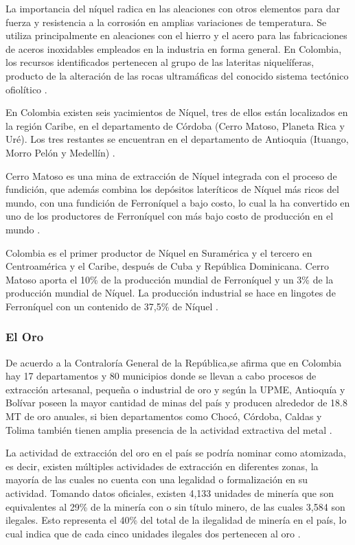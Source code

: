 \begin{spacing}{1.5}
La importancia del níquel radica en las aleaciones con otros elementos para dar fuerza y resistencia a la corrosión en amplias variaciones de temperatura. Se utiliza principalmente en aleaciones con el hierro y el acero para las fabricaciones de aceros inoxidables empleados en la industria en forma general. En Colombia, los recursos identificados pertenecen al grupo de las lateritas niquelíferas, producto de la alteración de las rocas ultramáficas del conocido sistema tectónico ofiolítico \cite{cardenas}.

En Colombia existen seis yacimientos de Níquel, tres de ellos están localizados en la región Caribe, en el departamento de Córdoba (Cerro Matoso, Planeta Rica  y Uré). Los tres restantes se encuentran en el departamento de Antioquia (Ituango, Morro Pelón y Medellín) \cite{niquelMain}.

Cerro Matoso es una mina de extracción de Níquel integrada con el proceso de  fundición, que además combina los depósitos lateríticos de Níquel más ricos del mundo, con una fundición de Ferroníquel a bajo costo, lo cual la ha convertido en uno de los productores de Ferroníquel con más bajo costo de producción en el mundo \cite{niquelMain}.

Colombia es el primer productor de Níquel en Suramérica y el tercero en Centroamérica y el Caribe, después de Cuba y República Dominicana. Cerro Matoso aporta el 10\% de la producción mundial de Ferroníquel y un 3\% de la producción mundial de Níquel. La producción industrial se hace en lingotes de Ferroníquel con un contenido de 37,5\% de Níquel \cite{niquelMain}.

\subsubsection{El Oro}
De acuerdo a la Contraloría General de la República,se afirma que en Colombia hay 17 departamentos y 80 municipios donde se llevan a cabo procesos de extracción artesanal, pequeña o industrial de oro y según la UPME, Antioquía y   Bolívar poseen la mayor cantidad de minas del país y producen alrededor de  18.8  MT de oro anuales, si bien departamentos como Chocó, Córdoba, Caldas y Tolima  también tienen amplia presencia de la actividad extractiva del metal \cite{oroMain}.

La actividad de extracción del oro en el país se podría nominar como atomizada, es decir, existen múltiples actividades de extracción en diferentes zonas, la mayoría de las cuales no cuenta con una legalidad o formalización en su actividad. Tomando datos oficiales, existen 4,133 unidades de minería que son  equivalentes al 29\% de la minería con o sin título minero, de las cuales 3,584 son ilegales. Esto representa el 40\% del total de la ilegalidad de minería en el país, lo cual indica que de cada cinco unidades ilegales dos pertenecen al oro \cite{oroMain}. 


\end{spacing}
